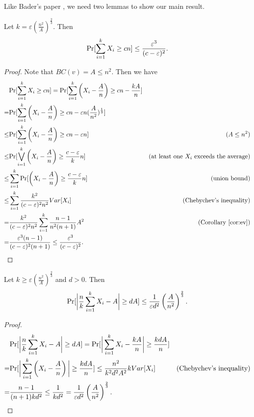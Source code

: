 \documentclass[10pt]{article}
\begin{document}
Like Bader's paper \cite{bader2007approximating}, we need two lemmas to show our main result.
\begin{lemma}
\label{lem:1}
Let $k=\varepsilon (\frac{n^2}{A})^{\frac{2}{3}}$. Then
$$\mathrm{Pr}[\sum_{i=1}^k X_i \geq cn] \leq \frac{\varepsilon^3}{(c-\varepsilon)^2}.$$
\end{lemma}
\begin{proof}
Note that $BC(v) = A \leq n^2$. Then we have
$$
\begin{aligned}
&\mathrm{Pr}[\sum_{i=1}^k X_i \geq cn] = \mathrm{Pr}[\sum_{i=1}^k \left( X_i - \frac{A}{n} \right) \geq cn-\frac{kA}{n}] \\
= & \mathrm{Pr}[\sum_{i=1}^k \left( X_i - \frac{A}{n} \right) \geq cn-\varepsilon n(\frac{A}{n^2})^{\frac{1}{3}}] \\
\leq & \mathrm{Pr}[\sum_{i=1}^k \left( X_i - \frac{A}{n} \right) \geq cn-\varepsilon n] &(A\leq n^2)\\
\leq & \mathrm{Pr}[\bigvee_{i=1}^k\left( X_i - \frac{A}{n} \right) \geq \frac{c-\varepsilon}{k}n] &\textrm{(at least one $X_i$ exceeds the average)} \\
\leq & \sum_{i=1}^k \mathrm{Pr}[\left( X_i - \frac{A}{n} \right) \geq \frac{c-\varepsilon}{k}n] &\textrm{(union bound)} \\
\leq & \sum_{i=1}^k \frac{k^2}{(c-\varepsilon)^2n^2} Var[X_i] &\textrm{(Chebychev's inequality)}\\
= & \frac{k^2}{(c-\varepsilon)^2n^2} \sum_{i=1}^k \frac{n-1}{n^2(n+1)}A^2 &\textrm{(Corollary \ref{cor:ev})} \\
= & \frac{\varepsilon^3 (n-1)}{(c-\varepsilon)^2 (n+1)} \leq \frac{\varepsilon^3}{(c-\varepsilon)^2}.
\end{aligned}
$$
\end{proof}

\begin{lemma}
\label{lem:2}
Let $k\geq\varepsilon (\frac{n^2}{A})^{\frac{2}{3}}$ and $d>0$. Then
$$\mathrm{Pr}[\bigg|\frac{n}{k}\sum_{i=1}^k X_i - A\bigg|\geq dA] \leq \frac{1}{\varepsilon d^2} \left(\frac{A}{n^2}\right)^{\frac{2}{3}}.$$
\end{lemma}
\begin{proof}
$$
\begin{aligned}
&\mathrm{Pr}[\bigg|\frac{n}{k}\sum_{i=1}^k X_i - A\bigg|\geq dA]
= \mathrm{Pr}[\bigg|\sum_{i=1}^k X_i - \frac{kA}{n}\bigg|\geq \frac{kdA}{n}] \\
= &\mathrm{Pr}[\bigg|\sum_{i=1}^k \left( X_i - \frac{A}{n}\right) \bigg|\geq \frac{kdA}{n}]
\leq \frac{n^2}{k^2d^2A^2}k Var[X_i] & \textrm{(Chebychev's inequality)}\\
= &\frac{n-1}{(n+1)kd^2} \leq \frac{1}{kd^2} = \frac{1}{\varepsilon d^2} \left(\frac{A}{n^2}\right)^{\frac{2}{3}}.
\end{aligned}
$$
\end{proof}
\end{document}

